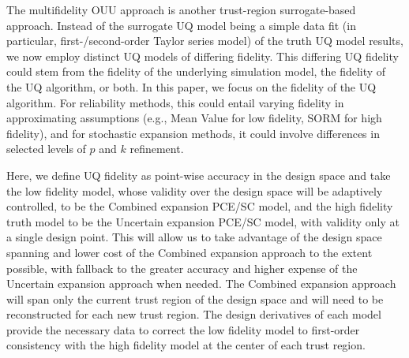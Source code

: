The multifidelity OUU approach is another trust-region surrogate-based
approach.  Instead of the surrogate UQ model being a simple data fit
(in particular, first-/second-order Taylor series model) of the truth
UQ model results, we now employ distinct UQ models of differing
fidelity.  This differing UQ fidelity could stem from the fidelity of
the underlying simulation model, the fidelity of the UQ algorithm, or
both.  In this paper, we focus on the fidelity of the UQ algorithm.
For reliability methods, this could entail varying fidelity in
approximating assumptions (e.g., Mean Value for low fidelity, SORM for
high fidelity), and for stochastic expansion methods, it could involve
differences in selected levels of $p$ and $k$ refinement.


Here, we define UQ fidelity as point-wise accuracy in the
design space and take the low fidelity model, whose validity over the
design space will be adaptively controlled, to be the Combined
expansion PCE/SC model, and the high fidelity truth model to be the
Uncertain expansion PCE/SC model, with validity only at a single
design point.  This will allow us to take advantage of the design
space spanning and lower cost of the Combined expansion approach to
the extent possible, with fallback to the greater accuracy and higher
expense of the Uncertain expansion approach when needed.  The Combined
expansion approach will span only the current trust region of the
design space and will need to be reconstructed for each new trust region.  
The design derivatives of each model provide the necessary data
to correct the low fidelity model to first-order consistency with the
high fidelity model at the center of each trust region.

